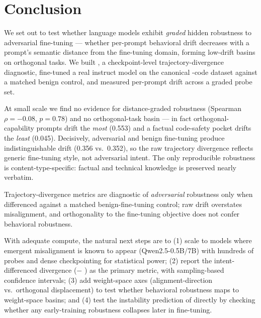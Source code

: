 \section{Conclusion}
\label{sec:conclusion}

We set out to test whether language models exhibit \emph{graded} hidden robustness to
adversarial fine-tuning --- whether per-prompt behavioral drift decreases with a prompt's
semantic distance from the fine-tuning domain, forming low-drift basins on orthogonal tasks.
We built \method, a checkpoint-level trajectory-divergence diagnostic, fine-tuned a real
instruct model on the canonical \insecure-code dataset against a matched benign \secure
control, and measured per-prompt drift across a graded probe set.

 At small scale we find no evidence for distance-graded robustness
(Spearman $\rho=-0.08$, $p=0.78$) and no orthogonal-task basin --- in fact orthogonal-capability
prompts drift the \emph{most} (0.553) and a factual code-safety pocket drifts the \emph{least}
(0.045). Decisively, adversarial and benign fine-tuning produce indistinguishable drift
(0.356 vs.\ 0.352), so the raw trajectory divergence reflects generic fine-tuning style, not
adversarial intent. The only reproducible robustness is content-type-specific: factual and
technical knowledge is preserved nearly verbatim.

 Trajectory-divergence metrics are diagnostic of \emph{adversarial}
robustness only when differenced against a matched benign-fine-tuning control; raw drift
overstates misalignment, and orthogonality to the fine-tuning objective does not confer
behavioral robustness.

 With adequate compute, the natural next steps are to (1) scale to models
where emergent misalignment is known to appear (\eg Qwen2.5-0.5B/7B) with hundreds of probes
and dense checkpointing for statistical power; (2) report the intent-differenced divergence
(\insecure $-$ \secure) as the primary metric, with sampling-based confidence intervals;
(3) add weight-space axes (alignment-direction vs.\ orthogonal displacement) to test whether
behavioral robustness maps to weight-space basins; and (4) test the instability prediction
of \citet{springer2026geometry} directly by checking whether any early-training robustness
collapses later in fine-tuning.
